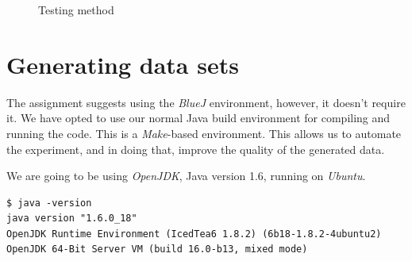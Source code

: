 \documentclass[10pt]{report}
\begin{document}
\begin{figure}[p]
    \centering
    \caption{Testing method}
    \label{flowchart}
\end{figure}


\section{Generating data sets}

The assignment suggests using the {\em BlueJ} environment, however, it doesn't require it.  We have opted to use our normal Java build environment for compiling and running the code.  This is a {\em Make}-based environment.  This allows us to automate the experiment, and in doing that, improve the quality of the generated data.

We are going to be using {\em OpenJDK}, Java version 1.6, running on {\em Ubuntu}.
\begin{verbatim}
$ java -version
java version "1.6.0_18"
OpenJDK Runtime Environment (IcedTea6 1.8.2) (6b18-1.8.2-4ubuntu2)
OpenJDK 64-Bit Server VM (build 16.0-b13, mixed mode)
\end{verbatim}
\end{document}
